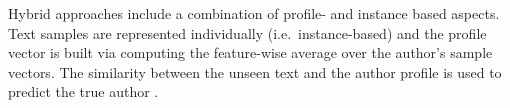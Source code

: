 Hybrid approaches include a combination of profile- and instance based aspects.
Text samples are represented individually (i.e.\ instance-based) and 
the profile vector is built via computing the feature-wise average over the author's sample vectors.
The similarity between the unseen text and the author profile is used to predict the true author \citep{stamatatos_survey_2009}.